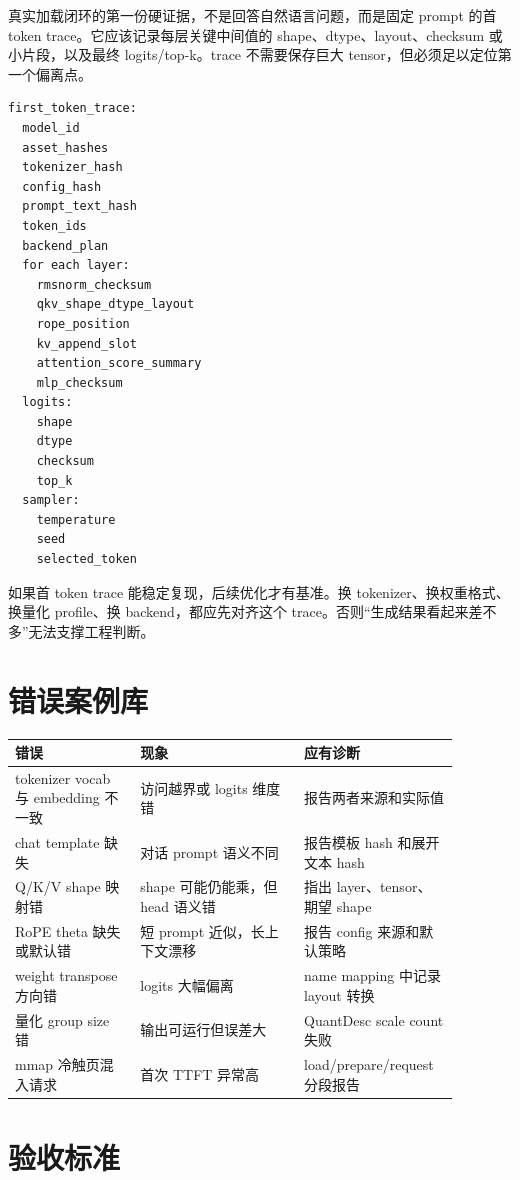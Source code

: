 真实加载闭环的第一份硬证据，不是回答自然语言问题，而是固定 prompt 的首 token trace。它应该记录每层关键中间值的 shape、dtype、layout、checksum 或小片段，以及最终 logits/top-k。trace 不需要保存巨大 tensor，但必须足以定位第一个偏离点。

\begin{lstlisting}[numbers=none,caption={first token trace 字段}]
first_token_trace:
  model_id
  asset_hashes
  tokenizer_hash
  config_hash
  prompt_text_hash
  token_ids
  backend_plan
  for each layer:
    rmsnorm_checksum
    qkv_shape_dtype_layout
    rope_position
    kv_append_slot
    attention_score_summary
    mlp_checksum
  logits:
    shape
    dtype
    checksum
    top_k
  sampler:
    temperature
    seed
    selected_token
\end{lstlisting}

如果首 token trace 能稳定复现，后续优化才有基准。换 tokenizer、换权重格式、换量化 profile、换 backend，都应先对齐这个 trace。否则“生成结果看起来差不多”无法支撑工程判断。

\section{错误案例库}

\begin{center}
\small
\begin{tabular}{p{0.26\linewidth}p{0.34\linewidth}p{0.28\linewidth}}
\toprule
错误 & 现象 & 应有诊断 \\
\midrule
tokenizer vocab 与 embedding 不一致 & 访问越界或 logits 维度错 & 报告两者来源和实际值 \\
chat template 缺失 & 对话 prompt 语义不同 & 报告模板 hash 和展开文本 hash \\
Q/K/V shape 映射错 & shape 可能仍能乘，但 head 语义错 & 指出 layer、tensor、期望 shape \\
RoPE theta 缺失或默认错 & 短 prompt 近似，长上下文漂移 & 报告 config 来源和默认策略 \\
weight transpose 方向错 & logits 大幅偏离 & name mapping 中记录 layout 转换 \\
量化 group size 错 & 输出可运行但误差大 & QuantDesc scale count 失败 \\
mmap 冷触页混入请求 & 首次 TTFT 异常高 & load/prepare/request 分段报告 \\
\bottomrule
\end{tabular}
\end{center}

\section{验收标准}

